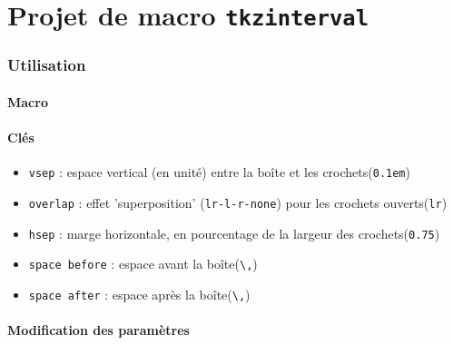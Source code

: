\documentclass[10pt]{article}
\begin{document}
\pagestyle{empty}

\part*{Projet de macro \texttt{tkzinterval}}

\section{Utilisation}

\subsection{Macro}

\begin{codeblockA}[title=Macro et clés]
\end{codeblockA}

\subsection{Clés}

\begin{itemize}[noitemsep]
	\item \texttt{vsep} : espace vertical (en unité) entre la boîte et les crochets\hfill(\texttt{0.1em})
	\item \texttt{overlap} : effet 'superposition' (\texttt{lr-l-r-none}) pour les crochets ouverts\hfill(\texttt{lr})
	\item \texttt{hsep} : marge horizontale, en pourcentage de la largeur des crochets\hfill(\texttt{0.75})
	\item \texttt{space before} : espace avant la boîte\hfill(\texttt{\textbackslash,})
	\item \texttt{space after} : espace après la boîte\hfill(\texttt{\textbackslash,})
\end{itemize}

\subsection{Modification des paramètres}

\begin{codeblockA}[title=Gestion des paramètres de longueur]
\setlength{}  %
\setlength{}  %
\end{codeblockA}
\end{document}
